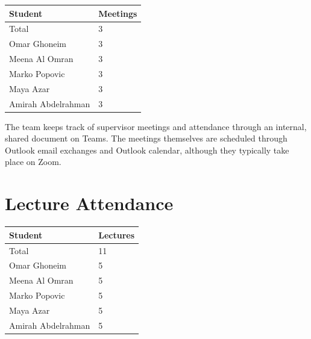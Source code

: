 \documentclass{article}
\begin{document}
\begin{table}[H]
\centering
\begin{tabular}{ll}
\toprule
\textbf{Student} & \textbf{Meetings}\\
\midrule
Total & 3\\
Omar Ghoneim & 3\\
Meena Al Omran & 3\\
Marko Popovic & 3\\
Maya Azar & 3\\
Amirah Abdelrahman & 3\\
\bottomrule
\end{tabular}
\end{table}

The team keeps track of supervisor meetings and attendance through an internal, shared document on Teams. The meetings themselves are scheduled through Outlook email exchanges and Outlook calendar, although they typically take place on Zoom.

\section{Lecture Attendance}



\begin{table}[H]
\centering
\begin{tabular}{ll}
\toprule
\textbf{Student} & \textbf{Lectures}\\
\midrule
Total & 11\\
Omar Ghoneim & 5\\
Meena Al Omran & 5\\
Marko Popovic & 5\\
Maya Azar & 5\\
Amirah Abdelrahman & 5\\
\bottomrule
\end{tabular}
\end{table}
\end{document}
